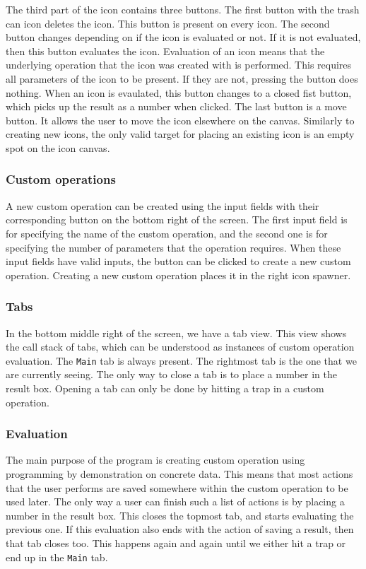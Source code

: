 \documentclass{report}
\begin{document}
The third part of the icon contains three buttons.
The first button with the trash can icon deletes the icon. This button is present on every icon.
The second button changes depending on if the icon is evaluated or not.
If it is not evaluated, then this button evaluates the icon. Evaluation of an icon means that the underlying operation that the icon was created with is performed.
This requires all parameters of the icon to be present. If they are not, pressing the button does nothing.
When an icon is evaulated, this button changes to a closed fist button, which picks up the result as a number when clicked.
The last button is a move button. It allows the user to move the icon elsewhere on the canvas. Similarly to creating new icons,
the only valid target for placing an existing icon is an empty spot on the icon canvas.

\subsubsection{Custom operations}
A new custom operation can be created using the input fields with their corresponding button on the bottom right of the screen.
The first input field is for specifying the name of the custom operation, and the second one is for specifying the number of parameters that the operation requires.
When these input fields have valid inputs, the button can be clicked to create a new custom operation. Creating a new custom operation places it in the right icon spawner.

\subsubsection{Tabs}
In the bottom middle right of the screen, we have a tab view. This view shows the call stack of tabs, which can be understood as instances of custom operation evaluation.
The \texttt{Main} tab is always present. The rightmost tab is the one that we are currently seeing. The only way to close a tab is to place a number in the result box.
Opening a tab can only be done by hitting a trap in a custom operation.

\subsubsection{Evaluation}
The main purpose of the program is creating custom operation using programming by demonstration on concrete data.
This means that most actions that the user performs are saved somewhere within the custom operation to be used later.
The only way a user can finish such a list of actions is by placing a number in the result box.
This closes the topmost tab, and starts evaluating the previous one.
If this evaluation also ends with the action of saving a result, then that tab closes too.
This happens again and again until we either hit a trap or end up in the \texttt{Main} tab.
\end{document}
